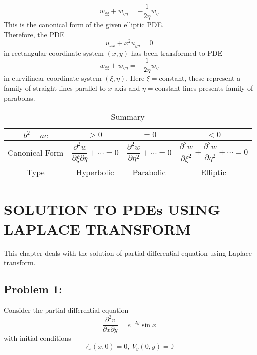 \documentclass[11pt]{report}
\newcommand{\sps}{\\[0.2cm]}
\begin{document}
	\begin{equation}
		w_{\xi\xi} + w_{\eta\eta} = - \frac{1}{2\eta}w_\eta\label{ex:3_4_10} \tag{10}
	\end{equation}
	This is the canonical form of the given elliptic PDE.\sps
	Therefore, the PDE
	\begin{equation*}
		u_{xx} + x^2u_{yy} = 0
	\end{equation*}
	in rectangular coordinate system $(x,y)$ has been transformed to PDE
	\begin{equation*}
		w_{\xi\xi} + w_{\eta\eta} = - \frac{1}{2\eta}w_\eta
	\end{equation*}
	in curvilinear coordinate system $(\xi,\eta)$. Here $\xi=$constant, these represent a family of straight lines parallel to $x$-axis and $\eta=$constant lines presents family of parabolas.
	
	\begin{table}[!ht]
		\centering
		\caption{Summary}
		\renewcommand{\arraystretch}{2}
		\begin{tabular}{|c|c|c|c|}
			\hline
			$b^2-ac$ & $> 0$ & $= 0$ & $< 0$\\\hline
			Canonical Form & $\dfrac{\partial^2 w}{\partial\xi\partial\eta}+ \cdots = 0$ & $\dfrac{\partial^2 w}{\partial\eta^2}+\cdots = 0$ & $\dfrac{\partial^2 w}{\partial\xi^2} + \dfrac{\partial^2 w}{\partial\eta^2}+\cdots = 0$\\\hline
			Type & Hyperbolic & Parabolic & Elliptic\\\hline
		\end{tabular}
	\end{table}


	\chapter{SOLUTION TO PDEs USING LAPLACE TRANSFORM}
	This chapter deals with the solution of partial differential equation using Laplace transform.
	
	\section*{Problem 1:}
	Consider the partial differential equation
	\begin{equation}
		\frac{\partial^2 v}{\partial x \partial y} = e^{-2y}\sin x \label{p:4_1_1} \tag{1}
	\end{equation}
	with initial conditions 
	\begin{equation}
		V_x(x,0)=0, ~ V_y(0,y)=0 \label{p:4_1_2} \tag{2}
	\end{equation}
\end{document}

